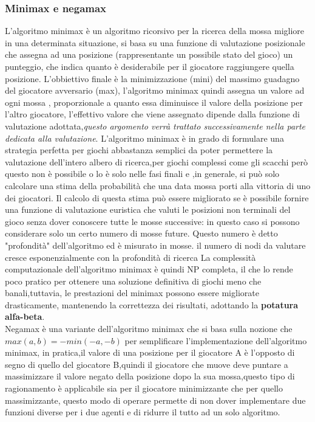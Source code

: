 \subsubsection{Minimax e negamax}
L'algoritmo minimax\cite{itwiki:125837390} è un algoritmo ricorsivo per la ricerca della mossa migliore in una determinata situazione, si basa su una funzione di valutazione posizionale che assegna ad una posizione (rappresentante un possibile stato del gioco) un punteggio,
che indica quanto è desiderabile per il giocatore raggiungere quella posizione.
L'obbiettivo finale è la minimizzazione (mini) del massimo guadagno del giocatore avversario (max),
l'algoritmo minimax quindi  assegna un valore ad ogni mossa , proporzionale a quanto essa diminuisce il valore della posizione per l'altro giocatore,
l'effettivo valore che viene assegnato dipende dalla funzione di valutazione adottata,\emph{questo argomento verrà trattato successivamente nella parte dedicata alla valutazione}.
L'algoritmo minimax è in grado di formulare una strategia perfetta per giochi abbastanza semplici da poter permettere 
la valutazione dell'intero albero di ricerca,per giochi complessi come gli scacchi però questo non è possibile o lo è 
solo nelle fasi finali e ,in generale, si può solo calcolare una stima della probabilità che una data mossa porti alla vittoria di uno dei giocatori.
Il calcolo di questa stima può essere migliorato se è possibile fornire una funzione di valutazione euristica che
valuti le posizioni non terminali del gioco senza dover conoscere tutte le mosse successive: in questo caso si possono
considerare solo un certo numero di mosse future. Questo numero è detto "profondità" dell'algoritmo ed è misurato
in mosse. il numero di nodi da valutare cresce esponenzialmente con la profondità di ricerca La complessità computazionale dell'algoritmo minimax è quindi 
NP completa, il che lo rende poco pratico per ottenere una soluzione definitiva di giochi meno che banali,tuttavia, le prestazioni del minimax possono essere migliorate drasticamente,
mantenendo la correttezza dei risultati, adottando la \textbf{potatura alfa-beta}.
\\Negamax è una variante dell'algoritmo minimax che si basa sulla nozione che $max(a,b)= -min(-a,-b)$ per semplificare l'implementazione dell'algoritmo minimax,
in pratica,il valore di una posizione per il giocatore A è l'opposto di segno di quello del giocatore B,quindi il giocatore che muove deve puntare a massimizzare il valore negato della posizione
dopo la sua mossa,questo tipo di ragionamento è applicabile sia per il giocatore minimizzante che per quello massimizzante, questo modo di operare permette di non dover implementare due funzioni diverse per i due agenti 
e di ridurre il tutto ad un solo algoritmo.



